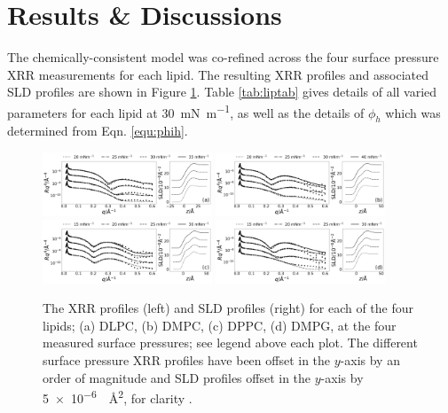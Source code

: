 \documentclass[amsmath,amssymb,twocolumn,superscriptaddress]{revtex4-1}
\begin{document}
\section{Results \& Discussions}
%
The chemically-consistent model was co-refined across the four surface pressure XRR measurements for each lipid.
The resulting XRR profiles and associated SLD profiles are shown in Figure \ref{fig:lipids}.
Table \ref{tab:liptab} gives details of all varied parameters for each lipid at \SI{30}{\milli\newton\per\meter}, as well as the details of $\phi_h$ which was determined from Eqn. \ref{equ:phih}.
%
\begin{figure}
	\centering
  \includegraphics[width=0.45\textwidth]{figures/dlpc_ref_sld}
	\includegraphics[width=0.45\textwidth]{figures/dmpc_ref_sld}
	\includegraphics[width=0.45\textwidth]{figures/dppc_ref_sld}
	\includegraphics[width=0.45\textwidth]{figures/dmpg_ref_sld}
	\caption{\small The XRR profiles (left) and SLD profiles (right) for each
  of the four lipids; (a) DLPC, (b) DMPC, (c) DPPC, (d) DMPG, at the four
  measured surface pressures; see legend above each plot. The different
  surface pressure XRR profiles have been offset in the $y$-axis by an order
  of magnitude and SLD profiles offset in the $y$-axis by
  \SI{5e-6}{\per\square\angstrom}, for clarity \cite{SI2019}.}
	\label{fig:lipids}
\end{figure}
%
%
\end{document}
